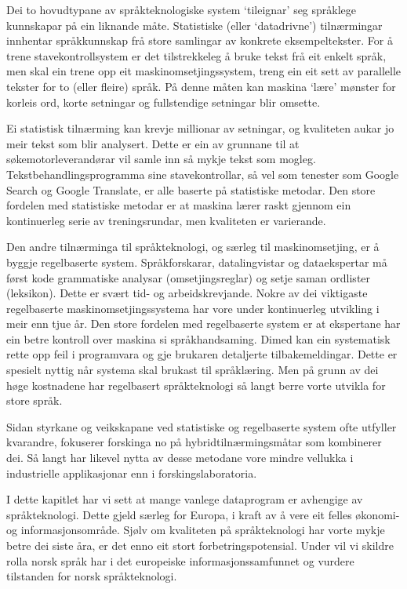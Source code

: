 \begin{multicols}{2}
Dei to hovudtypane av språkteknologiske system `tileignar' seg språklege kunnskapar på ein liknande måte. Statistiske (eller `datadrivne') tilnærmingar innhentar språkkunnskap frå store samlingar av konkrete eksempeltekster. For å trene stavekontrollsystem er det tilstrekkeleg å bruke tekst frå eit enkelt språk, men skal ein trene opp eit maskinomsetjingssystem, treng ein eit sett av parallelle tekster for to (eller fleire) språk. På denne måten kan maskina `lære' mønster for korleis ord, korte setningar og fullstendige setningar blir omsette.

Ei statistisk tilnærming kan krevje millionar av setningar, og kvaliteten aukar jo meir tekst som blir analysert. Dette er ein av grunnane til at søkemotorleverandørar vil samle inn så mykje tekst som mogleg. Tekstbehandlingsprogramma sine stavekontrollar, så vel som tenester som Google Search og Google Translate, er alle baserte på statistiske metodar. Den store fordelen med statistiske metodar er at maskina lærer raskt gjennom ein kontinuerleg serie av treningsrundar, men kvaliteten er varierande.

Den andre tilnærminga til språkteknologi, og særleg til maskinomsetjing, er å byggje regelbaserte system. Språkforskarar, datalingvistar og dataekspertar må først kode grammatiske analysar (omsetjingsreglar) og setje saman ordlister (leksikon). Dette er svært tid- og arbeidskrevjande. Nokre av dei viktigaste regelbaserte maskinomsetjingssystema har vore under kontinuerleg utvikling i meir enn tjue år. Den store fordelen med regelbaserte system er at ekspertane har ein betre kontroll over maskina si språkhandsaming. Dimed kan ein systematisk rette opp feil i programvara og gje brukaren detaljerte tilbakemeldingar. Dette er spesielt nyttig når systema skal brukast til språklæring. Men på grunn av dei høge kostnadene har regelbasert språkteknologi så langt berre vorte utvikla for store språk.


Sidan styrkane og veikskapane ved statistiske og regelbaserte system ofte utfyller kvarandre, fokuserer forskinga no på hybridtilnærmingsmåtar som kombinerer dei. Så langt har likevel nytta av desse metodane vore mindre vellukka i industrielle applikasjonar enn i forskingslaboratoria. 

I dette kapitlet har vi sett at mange vanlege dataprogram er avhengige av språkteknologi. Dette gjeld særleg for Europa, i kraft av å vere eit felles økonomi- og informasjonsområde. Sjølv om kvaliteten på språkteknologi har vorte mykje betre dei siste åra, er det enno eit stort forbetringspotensial. Under vil vi skildre rolla 
norsk språk har i det europeiske informasjonssamfunnet og vurdere tilstanden for norsk språkteknologi. 
\end{multicols}

